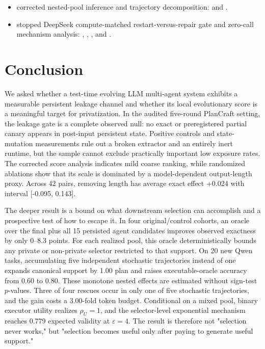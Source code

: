 \documentclass{article}
\begin{document}
\begin{itemize}
  \item corrected nested-pool inference and trajectory decomposition: \texttt{} and \texttt{}.
  \item stopped DeepSeek compute-matched restart-versus-repair gate and zero-call mechanism analysis: \texttt{}, \texttt{}, \texttt{}, and \texttt{}.
\end{itemize}

\section{Conclusion}

We asked whether a test-time evolving LLM multi-agent system exhibits a measurable persistent leakage channel and whether its local evolutionary score is a meaningful target for privatization. In the audited five-round PlanCraft setting, the leakage gate is a complete observed null: no exact or preregistered partial canary appears in post-input persistent state. Positive controls and state-mutation measurements rule out a broken extractor and an entirely inert runtime, but the sample cannot exclude practically important low exposure rates. The corrected score analysis indicates mild coarse ranking, while randomized ablations show that its scale is dominated by a model-dependent output-length proxy. Across 42 pairs, removing length has average exact effect +0.024 with interval [-0.095, 0.143].

The deeper result is a bound on what downstream selection can accomplish and a prospective test of how to escape it. In four original/control cohorts, an oracle over the final plus all 15 persisted agent candidates improves observed exactness by only 0--8.3 points. For each realized pool, this oracle deterministically bounds any private or non-private selector restricted to that support. On 20 new Qwen tasks, accumulating five independent stochastic trajectories instead of one expands canonical support by 1.00 plan and raises executable-oracle accuracy from 0.60 to 0.80. These monotone nested effects are estimated without sign-test \(p\)-values. Three of four rescues occur in only one of five stochastic trajectories, and the gain costs a 3.00-fold token budget. Conditional on a mixed pool, binary executor utility realizes \(\rho_U=1\), and the selector-level exponential mechanism reaches 0.779 expected validity at \(\varepsilon=4\). The result is therefore not "selection never works," but "selection becomes useful only after paying to generate useful support."
\end{document}
